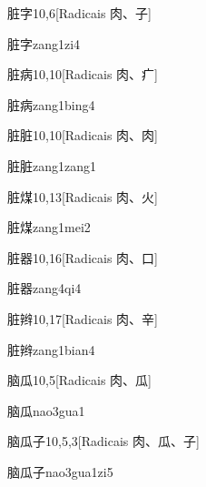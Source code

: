 \begin{entry}{脏字}{10,6}[Radicais ⾁、⼦]
  \begin{phonetics}{脏字}{zang1zi4}
  \end{phonetics}
\end{entry}

\begin{entry}{脏病}{10,10}[Radicais ⾁、⽧]
  \begin{phonetics}{脏病}{zang1bing4}
  \end{phonetics}
\end{entry}

\begin{entry}{脏脏}{10,10}[Radicais ⾁、⾁]
  \begin{phonetics}{脏脏}{zang1zang1}
  \end{phonetics}
\end{entry}

\begin{entry}{脏煤}{10,13}[Radicais ⾁、⽕]
  \begin{phonetics}{脏煤}{zang1mei2}
  \end{phonetics}
\end{entry}

\begin{entry}{脏器}{10,16}[Radicais ⾁、⼝]
  \begin{phonetics}{脏器}{zang4qi4}
  \end{phonetics}
\end{entry}

\begin{entry}{脏辫}{10,17}[Radicais ⾁、⾟]
  \begin{phonetics}{脏辫}{zang1bian4}
  \end{phonetics}
\end{entry}

\begin{entry}{脑瓜}{10,5}[Radicais ⾁、⽠]
  \begin{phonetics}{脑瓜}{nao3gua1}
  \end{phonetics}
\end{entry}

\begin{entry}{脑瓜子}{10,5,3}[Radicais ⾁、⽠、⼦]
  \begin{phonetics}{脑瓜子}{nao3gua1zi5}
  \end{phonetics}
\end{entry}


